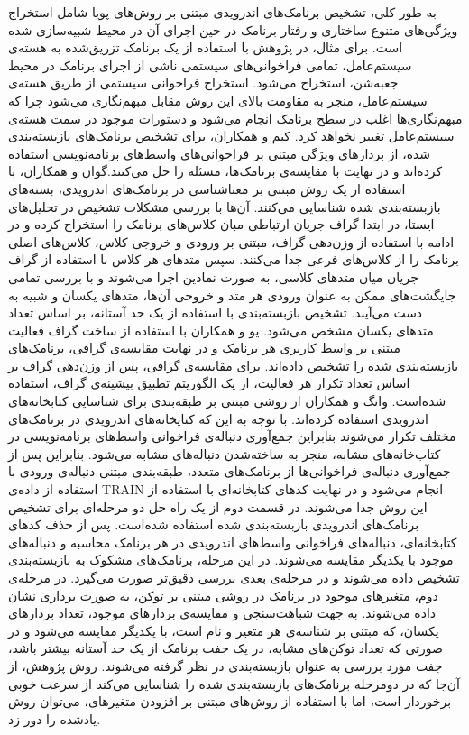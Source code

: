 به طور کلی، تشخیص برنامک‌های اندرویدی مبتنی بر روش‌های پویا شامل استخراج ویژگی‌های متنوع ساختاری و رفتار برنامک در حین اجرای آن در محیط‌ شبیه‌سازی شده ‌است. برای مثال، در پژوهش  با استفاده از یک برنامک تزریق‌شده به هسته‌ی سیستم‌عامل، تمامی فراخوانی‌های سیستمی ناشی از اجرای برنامک در محیط جعبه‌شن، استخراج می‌شود. استخراج فراخوانی سیستمی از طریق هسته‌ی سیستم‌عامل، منجر به مقاومت بالای این روش مقابل مبهم‌نگاری می‌شود چرا که مبهم‌نگاری‌ها اغلب در سطح برنامک انجام می‌شود و دستورات موجود در سمت هسته‌ی سیستم‌عامل تغییر نخواهد کرد. کیم‌ و همکاران، برای تشخیص برنامک‌های بازبسته‌بندی شده، از بردار‌های ویژگی مبتنی بر فراخوانی‌های واسط‌های برنامه‌نویسی استفاده کرده‌اند و در نهایت با مقایسه‌ی برنامک‌ها، مسئله‌ را حل می‌کنند.گوان و همکاران، با استفاده از یک روش مبتنی بر معناشناسی در برنامک‌های اندرویدی، بسته‌های بازبسته‌بندی شده شناسایی می‌کنند. آن‌ها با بررسی مشکلات تشخیص در تحلیل‌های ایستا، در ابتدا گراف جریان ارتباطی مبان کلاس‌های برنامک‌ را استخراج کرده و در ادامه با استفاده از وزن‌دهی گراف، مبتنی بر ورودی و خروجی کلاس، کلاس‌های اصلی برنامک را از کلاس‌های فرعی  جدا می‌کنند. سپس متد‌های هر کلاس با استفاده از گراف جریان میان متد‌های کلاسی، به صورت نمادین اجرا می‌شوند و با بررسی تمامی جایگشت‌های ممکن به عنوان ورودی هر متد و خروجی آن‌ها، متد‌های یکسان و شبیه به دست می‌آیند. تشخیص بازبسته‌بندی با استفاده از یک حد آستانه، بر اساس تعداد متد‌های یکسان مشخص می‌شود. یو و همکاران با استفاده از ساخت گراف فعالیت مبتنی بر واسط کاربری هر برنامک و در نهایت مقایسه‌ی گرافی، برنامک‌های بازبسته‌بندی شده را تشخیص داده‌اند. برای مقایسه‌ی گرافی، پس از وزن‌دهی گراف بر اساس تعداد تکرار هر فعالیت، از یک الگوریتم تطبیق بیشینه‌ی گراف، استفاده شده‌است.
وانگ و همکاران از روشی مبتنی بر طبقه‌بندی برای شناسایی کتابخانه‌های اندرویدی استفاده کرده‌اند. با توجه به این که کتایخانه‌های اندرویدی در برنامک‌های مختلف تکرار می‌شوند بنابراین جمع‌آوری دنباله‌ی فراخوانی‌ واسط‌های برنامه‌نویسی در کتاب‌خانه‌های مشابه، منجر به ساخته‌شدن دنباله‌های مشابه می‌شود. بنابراین پس از جمع‌آوری دنباله‌ی فراخوانی‌ها از برنامک‌های متعدد، طبقه‌بندی مبتنی دنباله‌ی ورودی با استفاده از داده‌ی TRAIN انجام می‌شود و در نهایت کد‌های کتابخانه‌ای با استفاده از این روش جدا می‌شوند. در قسمت دوم از یک راه حل دو مرحله‌ای برای تشخیص برنامک‌های اندرویدی بازبسته‌بندی شده استفاده شده‌است. پس از حذف کد‌های کتابخانه‌ای، دنباله‌های فراخوانی واسط‌های اندرویدی در هر برنامک محاسبه و دنباله‌های موجود با یکدیگر مقایسه می‌شوند. در این مرحله، برنامک‌های مشکوک به بازبسته‌بندی تشخیص داده می‌شوند و در مرحله‌ی بعدی بررسی دقیق‌تر صورت می‌گیرد. در مرحله‌ی دوم، متغیر‌های موجود در برنامک در روشی مبتنی بر توکن، به صورت برداری نشان داده می‌شوند. به جهت شباهت‌سنجی و مقایسه‌ی بردار‌های موجود، تعداد بردار‌های یکسان، که مبتنی بر شناسه‌ی هر متغیر و نام است، با یکدیگر مقایسه می‌شود و در صورتی که تعداد توکن‌های مشابه، در یک جفت برنامک از یک حد آستانه بیشتر باشد، جفت مورد بررسی به عنوان بازبسته‌بندی در نظر گرفته می‌شوند. روش پژوهش، از آن‌جا که در دومرحله برنامک‌های بازبسته‌بندی شده را شناسایی می‌کند از سرعت خوبی برخوردار است، اما با استفاده از روش‌های مبتنی بر افزودن متغیر‌های، می‌توان روش یاد‌شده را دور زد.\\
